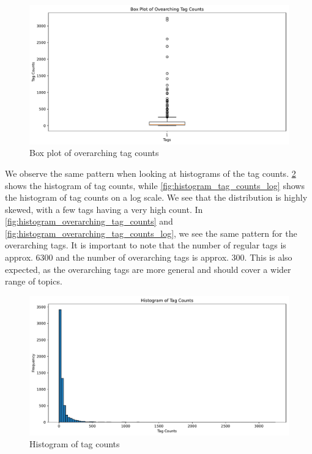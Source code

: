 \begin{figure}[h]
    \centering
    \includegraphics[width=\textwidth]{figures/box_plot_overarching_tag_counts.pdf}
    \caption{Box plot of overarching tag counts}
    \label{fig:box_plot_overarching_tag_counts}
\end{figure}

We observe the same pattern when looking at histograms of the tag counts. \cref{fig:histogram_tag_counts} shows the histogram of tag counts, while \cref{fig:histogram_tag_counts_log} shows the histogram of tag counts on a log scale. We see that the distribution is highly skewed, with a few tags having a very high count. In \cref{fig:histogram_overarching_tag_counts} and \cref{fig:histogram_overarching_tag_counts_log}, we see the same pattern for the overarching tags. It is important to note that the number of regular tags is approx. 6300 and the number of overarching tags is approx. 300. This is also expected, as the overarching tags are more general and should cover a wider range of topics.

\begin{figure}[h]
    \centering
    \includegraphics[width=\textwidth]{figures/histogram_tag_counts.pdf}
    \caption{Histogram of tag counts}
    \label{fig:histogram_tag_counts}
\end{figure}

